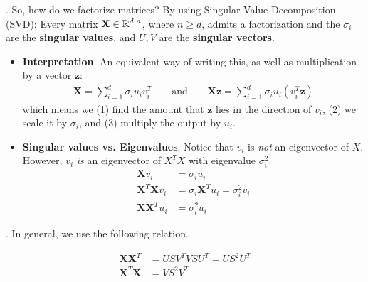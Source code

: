 \documentclass[12pt]{article}
\newcommand{\myspace}{\vspace{2\bigskipamount}}
\newcommand\p{\Needspace{10\baselineskip} \noindent}
\begin{document}
\newpage
\p {}. So, how do we factorize matrices? By using Singular Value Decomposition (SVD): Every matrix $\mathbf{X}  \in \mathbb{R}^{d,n}$, where $n \ge d$, admits a factorization 
and the $\sigma_i$ are the \textbf{singular values}, and $U, V$ are the \textbf{singular vectors}. 
\begin{itemize}

	\item \textbf{Interpretation}. An equivalent way of writing this, as well as multiplication by a vector $\bm{z}$:
		\begin{align}
		\mathbf{X} = \sum_{i = 1}^{d} \sigma_i u_i v_i^T  \qquad \text{and} \qquad
		\mathbf{X} \bm{z} = \sum_{i = 1}^{d} \sigma_i u_i (v_i^T \bm{z})
		\end{align}
	which means we (1) find the amount that $\bm{z}$ lies in the direction of $v_i$, (2) we scale it by $\sigma_i$, and (3) multiply the output by $u_i$. 



	\item \textbf{Singular values vs. Eigenvalues}. \purple{[35:00]} Notice that $v_i$ is \textit{not} an eigenvector of $X$. However, $v_i$ \textit{is} an eigenvector of $X^T X$ with eigenvalue $\sigma_i^2$. 
	\begin{align}
		 \mathbf{X}v_i &= \sigma_i u_i \\
		 \mathbf{X}^T\mathbf{X}v_i &= \sigma_i \mathbf{X}^T u_i = \sigma_i^2 v_i \\
		 \mathbf{X}\mathbf{X}^T u_i &= \sigma_i^2 u_i
	\end{align}
\end{itemize}

\myspace
{}
\p {}. In general, we use the following relation.

\begin{align}
\mathbf{X}\mathbf{X}^T &= U S V^T V S U^T = U S^2 U^T \\
\mathbf{X}^T\mathbf{X} &= V S^2 V^T 
\end{align}
\end{document}
